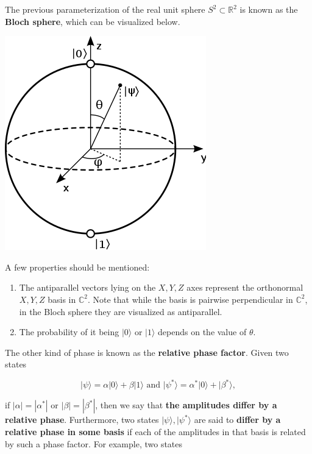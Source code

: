 \documentclass{article}
\begin{document}
    \begin{definition}
      The previous parameterization of the real unit sphere $S^2 \subset \mathbb{R}^2$ is known as the \textbf{Bloch sphere}, which can be visualized below. 

      \begin{center}
        \includegraphics[scale=0.4]{img/330px-Bloch_sphere.png}
      \end{center}


      A few properties should be mentioned: 
      \begin{enumerate}
        \item The antiparallel vectors lying on the $X, Y, Z$ axes represent the orthonormal $X, Y, Z$ basis in $\mathbb{C}^2$. Note that while the basis is pairwise perpendicular in $\mathbb{C}^2$, in the Bloch sphere they are visualized as antiparallel. 

        \item The probability of it being $|0\rangle$ or $|1\rangle$ depends on the value of $\theta$. 
      \end{enumerate}
    \end{definition}

    



    The other kind of phase is known as the \textbf{relative phase factor}. Given two states

      \[|\psi \rangle = \alpha |0\rangle + \beta |1\rangle \text{ and } |\psi^* \rangle = \alpha^* |0 \rangle + | \beta^* \rangle,\]

    if $|\alpha| = |\alpha^*|$ or $|\beta| = |\beta^*|$, then we say that \textbf{the amplitudes differ by a relative phase}. Furthermore, two states $|\psi \rangle, |\psi^* \rangle$ are said to \textbf{differ by a relative phase in some basis} if each of the amplitudes in that basis is related by such a phase factor. For example, two states 
\end{document}

